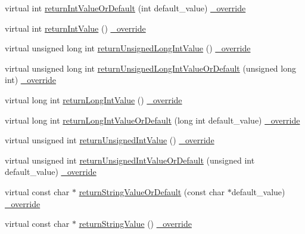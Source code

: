\begin{DoxyCompactItemize}
virtual int \hyperlink{class_mock_actual_call_trace_aee0c0fdc138f958a7d8c230d38d6be31}{return\+Int\+Value\+Or\+Default} (int default\+\_\+value) \hyperlink{_cpp_u_test_config_8h_a049bea15dd750e15869863c94c1efc3b}{\+\_\+override}
\item 
virtual int \hyperlink{class_mock_actual_call_trace_a734bbe5a0a6f79b3b54f5998c9856d49}{return\+Int\+Value} () \hyperlink{_cpp_u_test_config_8h_a049bea15dd750e15869863c94c1efc3b}{\+\_\+override}
\item 
virtual unsigned long int \hyperlink{class_mock_actual_call_trace_a8ef63817f8b7b2c156ee662cd90cc2b3}{return\+Unsigned\+Long\+Int\+Value} () \hyperlink{_cpp_u_test_config_8h_a049bea15dd750e15869863c94c1efc3b}{\+\_\+override}
\item 
virtual unsigned long int \hyperlink{class_mock_actual_call_trace_a8e3d1d02eacbe6202fc9bd09a49d0b4a}{return\+Unsigned\+Long\+Int\+Value\+Or\+Default} (unsigned long int) \hyperlink{_cpp_u_test_config_8h_a049bea15dd750e15869863c94c1efc3b}{\+\_\+override}
\item 
virtual long int \hyperlink{class_mock_actual_call_trace_a049f79a4feb62a3f2870f68ead142ef2}{return\+Long\+Int\+Value} () \hyperlink{_cpp_u_test_config_8h_a049bea15dd750e15869863c94c1efc3b}{\+\_\+override}
\item 
virtual long int \hyperlink{class_mock_actual_call_trace_a12208c00f9a9d1803ddfcc9fd98d3f5a}{return\+Long\+Int\+Value\+Or\+Default} (long int default\+\_\+value) \hyperlink{_cpp_u_test_config_8h_a049bea15dd750e15869863c94c1efc3b}{\+\_\+override}
\item 
virtual unsigned int \hyperlink{class_mock_actual_call_trace_aebd9c9f4c64c2c37eeea1dc1e8ab5949}{return\+Unsigned\+Int\+Value} () \hyperlink{_cpp_u_test_config_8h_a049bea15dd750e15869863c94c1efc3b}{\+\_\+override}
\item 
virtual unsigned int \hyperlink{class_mock_actual_call_trace_a8ec8099deff04b565b7268ce70978c8e}{return\+Unsigned\+Int\+Value\+Or\+Default} (unsigned int default\+\_\+value) \hyperlink{_cpp_u_test_config_8h_a049bea15dd750e15869863c94c1efc3b}{\+\_\+override}
\item 
virtual const char $\ast$ \hyperlink{class_mock_actual_call_trace_a75ae12894a17f44c8e5e0d0b4b34626d}{return\+String\+Value\+Or\+Default} (const char $\ast$default\+\_\+value) \hyperlink{_cpp_u_test_config_8h_a049bea15dd750e15869863c94c1efc3b}{\+\_\+override}
\item 
virtual const char $\ast$ \hyperlink{class_mock_actual_call_trace_a8e77c2686dd05e710d0cf4b65cc8ecef}{return\+String\+Value} () \hyperlink{_cpp_u_test_config_8h_a049bea15dd750e15869863c94c1efc3b}{\+\_\+override}

\end{DoxyCompactItemize}
